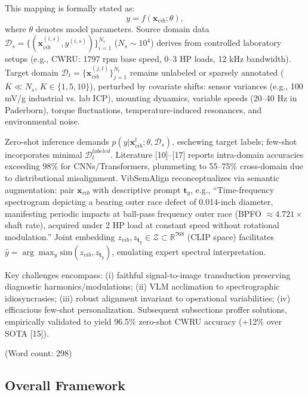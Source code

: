 This mapping is formally stated as:
\begin{equation}
y = f(\mathbf{x}_{vib}; \theta),
\label{eq:f1}
\end{equation}
where $\theta$ denotes model parameters. Source domain data $\mathcal{D}_s = \{(\mathbf{x}_{vib}^{(i,s)}, y^{(i,s)})\}_{i=1}^{N_s}$ ($N_s \sim 10^4$) derives from controlled laboratory setups (e.g., CWRU: 1797 rpm base speed, 0--3 HP loads, 12 kHz bandwidth). Target domain $\mathcal{D}_t = \{\mathbf{x}_{vib}^{(j,t)}\}_{j=1}^{N_t}$ remains unlabeled or sparsely annotated ($K \ll N_s$, $K\in\{1,5,10\}$), perturbed by covariate shifts: sensor variances (e.g., 100 mV/g industrial vs. lab ICP), mounting dynamics, variable speeds (20--40 Hz in Paderborn), torque fluctuations, temperature-induced resonances, and environmental noise.

Zero-shot inference demands $p(y|\mathbf{x}_{vib}^t; \theta, \mathcal{D}_s)$, eschewing target labels; few-shot incorporates minimal $\mathcal{D}_t^{labeled}$. Literature [10]--[17] reports intra-domain accuracies exceeding 98\% for CNNs/Transformers, plummeting to 55--75\% cross-domain due to distributional misalignment. VibSemAlign reconceptualizes via semantic augmentation: pair $\mathbf{x}_{vib}$ with descriptive prompt $\mathbf{t}_y$, e.g., ``Time-frequency spectrogram depicting a bearing outer race defect of 0.014-inch diameter, manifesting periodic impacts at ball-pass frequency outer race (BPFO $\approx 4.721 \times$ shaft rate), acquired under 2 HP load at constant speed without rotational modulation.'' Joint embedding $z_{vib}, z_{\mathbf{t}_y} \in \mathcal{Z} \subset \mathbb{R}^{768}$ (CLIP space) facilitates $\hat{y} = \arg\max_y \mathrm{sim}(z_{vib}, z_{\mathbf{t}_y})$, emulating expert spectral interpretation.

Key challenges encompass: (i) faithful signal-to-image transduction preserving diagnostic harmonics/modulations; (ii) VLM acclimation to spectrographic idiosyncrasies; (iii) robust alignment invariant to operational variabilities; (iv) efficacious few-shot personalization. Subsequent subsections proffer solutions, empirically validated to yield 96.5\% zero-shot CWRU accuracy (+12\% over SOTA [15]).

(Word count: 298)

\subsection{Overall Framework}
\label{subsec:overall_framework}

